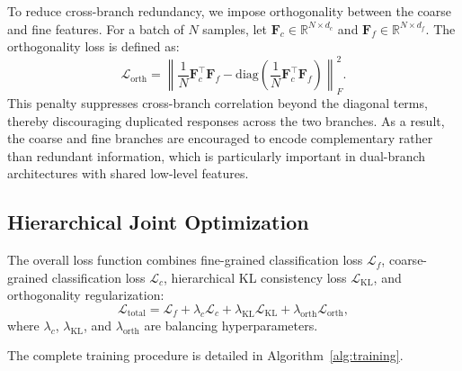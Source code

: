 \documentclass[pdflatex,sn-mathphys-num]{sn-jnl}
\theoremstyle{thmstyleone}%
\theoremstyle{thmstyletwo}%
\theoremstyle{thmstylethree}%
\begin{document}
To reduce cross-branch redundancy, we impose orthogonality between the coarse and fine features. For a batch of $N$ samples, let $\mathbf{F}_c \in \mathbb{R}^{N \times d_c}$ and $\mathbf{F}_f \in \mathbb{R}^{N \times d_f}$. The orthogonality loss is defined as:
\begin{equation}
\mathcal{L}_{\text{orth}} = \left\| \frac{1}{N}\mathbf{F}_c^\top \mathbf{F}_f - \text{diag}\left(\frac{1}{N}\mathbf{F}_c^\top \mathbf{F}_f\right) \right\|_F^2.
\label{eq:orth_loss}
\end{equation}
This penalty suppresses cross-branch correlation beyond the diagonal terms, thereby discouraging duplicated responses across the two branches. As a result, the coarse and fine branches are encouraged to encode complementary rather than redundant information, which is particularly important in dual-branch architectures with shared low-level features.

\subsection{Hierarchical Joint Optimization}
The overall loss function combines fine-grained classification loss $\mathcal{L}_f$, coarse-grained classification loss $\mathcal{L}_c$, hierarchical KL consistency loss $\mathcal{L}_{\mathrm{KL}}$, and orthogonality regularization:
\begin{equation}
\mathcal{L}_{\text{total}} = \mathcal{L}_f + \lambda_c \mathcal{L}_c + \lambda_{\mathrm{KL}} \mathcal{L}_{\mathrm{KL}} + \lambda_{\mathrm{orth}} \mathcal{L}_{\mathrm{orth}},
\label{eq:total_loss}
\end{equation}
where $\lambda_c$, $\lambda_{\mathrm{KL}}$, and $\lambda_{\mathrm{orth}}$ are balancing hyperparameters.

The complete training procedure is detailed in Algorithm~\ref{alg:training}.
\end{document}
